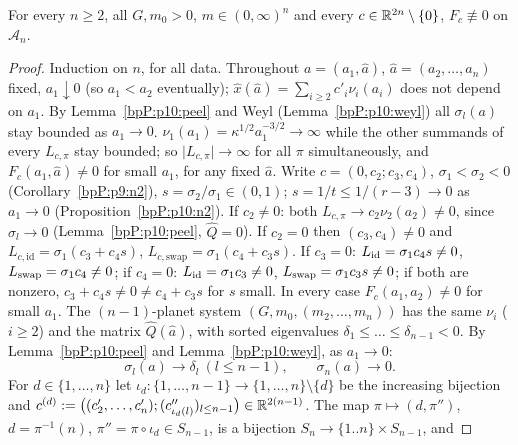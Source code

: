 \begin{theorem}\label{bpP:p10:F-nonzero}
For every $n\ge2$, all $G,m_0>0$, $m\in(0,\infty)^n$ and every $c\in\mathbb{R}^{2n}\setminus\{0\}$, $F_c\not\equiv0$ on $\mathcal A_n$.
\end{theorem}
\begin{proof}
Induction on $n$, for all data. Throughout $a=(a_1,\hat a)$, $\hat a=(a_2,\dots,a_n)$ fixed, $a_1\downarrow0$ (so $a_1<a_2$ eventually); $\hat x(\hat a)=\sum_{i\ge2}c'_i\nu_i(a_i)$ does not depend on $a_1$. By Lemma~\ref{bpP:p10:peel} and Weyl (Lemma~\ref{bpP:p10:weyl}) all $\sigma_l(a)$ stay bounded as $a_1\to0$.
\label{stepP:p10:F-A} $\nu_1(a_1)=\kappa^{1/2}a_1^{-3/2}\to\infty$ while the other summands of every $L_{c,\pi}$ stay bounded; so $\lvert L_{c,\pi}\rvert\to\infty$ for all $\pi$ simultaneously, and $F_c(a_1,\hat a)\ne0$ for small $a_1$, for any fixed $\hat a$.
\label{stepP:p10:F-B} Write $c=(0,c_2;c_3,c_4)$, $\sigma_1<\sigma_2<0$ (Corollary~\ref{bpP:p9:n2}), $s=\sigma_2/\sigma_1\in(0,1)$; $s=1/t\le1/(r-3)\to0$ as $a_1\to0$ (Proposition~\ref{bpP:p10:n2}). If $c_2\ne0$: both $L_{c,\pi}\to c_2\nu_2(a_2)\ne0$, since $\sigma_l\to0$ (Lemma~\ref{bpP:p10:peel}, $\hat Q=0$). If $c_2=0$ then $(c_3,c_4)\ne0$ and $L_{c,\mathrm{id}}=\sigma_1(c_3+c_4s)$, $L_{c,\mathrm{swap}}=\sigma_1(c_4+c_3s)$. If $c_3=0$: $L_{\rm id}=\sigma_1c_4s\ne0$, $L_{\rm swap}=\sigma_1c_4\ne0$; if $c_4=0$: $L_{\rm id}=\sigma_1c_3\ne0$, $L_{\rm swap}=\sigma_1c_3s\ne0$; if both are nonzero, $c_3+c_4s\ne0\ne c_4+c_3s$ for $s$ small. In every case $F_c(a_1,a_2)\ne0$ for small $a_1$.
\label{stepP:p10:F-C} The $(n-1)$-planet system $(G,m_0,(m_2,\dots,m_n))$ has the same $\nu_i$ ($i\ge2$) and the matrix $\hat Q(\hat a)$, with sorted eigenvalues $\delta_1\le\dots\le\delta_{n-1}<0$. By Lemma~\ref{bpP:p10:peel} and Lemma~\ref{bpP:p10:weyl}, as $a_1\to0$:
\[\sigma_l(a)\to\delta_l\ (l\le n-1),\qquad\sigma_n(a)\to0 .\]
For $d\in\{1,\dots,n\}$ let $\iota_d:\{1,\dots,n-1\}\to\{1,\dots,n\}\setminus\{d\}$ be the increasing bijection and $c^{(d)}:=\big((c'_2,\dots,c'_n);(c''_{\iota_d(l)})_{l\le n-1}\big)\in\mathbb{R}^{2(n-1)}$. The map $\pi\mapsto(d,\pi'')$, $d=\pi^{-1}(n)$, $\pi''=\pi\circ\iota_d\in S_{n-1}$, is a bijection $S_n\to\{1..n\}\times S_{n-1}$, and

\end{proof}
